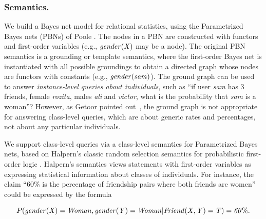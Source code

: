 \documentclass[oribibl]{llncs}
\begin{document}
\subsubsection{Semantics.} 
We build a Bayes net model for relational statistics, using 
the Parametrized Bayes nets (PBNs) of Poole \cite{Poole2003}. The nodes in a PBN are constructed with functors and first-order variables (e.g., $\it{gender}(X)$ may be a node). The original PBN semantics is a grounding or template semantics, where the first-order Bayes net is instantiated with all possible groundings to obtain a directed graph whose nodes are functors with constants (e.g., $\it{gender}(sam)$). The ground graph can be used to answer {\em instance-level queries about individuals}, such as ``if user \emph{sam} has 3 friends, female \emph{rozita}, males \emph{ali} and \emph{victor}, what is the probability that \emph{sam} is a woman''? However, as Getoor pointed out~\cite{Getoor2001a}, the ground graph is not appropriate for answering class-level queries, %
which are about generic rates and percentages, not about any particular individuals. 

We support class-level queries via a class-level semantics for Parametrized Bayes nets, based on Halpern's classic random selection semantics for probabilistic first-order logic \cite{Halpern90,Bacchus90}. Halpern's semantics views statements with first-order variables as expressing statistical information about classes  of individuals. For instance, the claim ``60\% is the percentage of friendship pairs where both  friends are women''
could be expressed by the formula 

\[
P(\it{gender}(X) = \it{Woman}, \it{gender}(Y) = \it{Woman}|\it{Friend}(X,Y) = \mathit{T}) = 60\%.
\]

%


\end{document}
